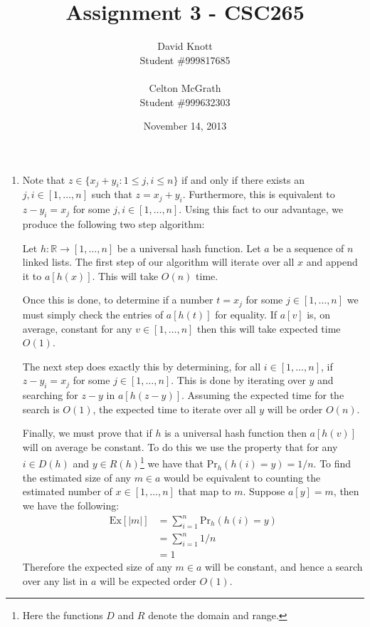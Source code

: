 \documentclass[letterpaper,10pt]{article}
\begin{document}
\title{Assignment 3 - CSC265}
\author{David Knott \\ Student \#999817685 \\ \\  Celton McGrath \\ Student \#999632303}
\date{November 14, 2013}
\maketitle
\begin{enumerate}
  \item Note that $z \in \{x_j + y_i : 1 \leq j, i \leq n \}$ if and only if there exists an $j, i \in [1,\dots, n] $ such that $z = x_j + y_i$. Furthermore, this is equivalent to $z - y_i = x_j$ for some $j, i \in [1,\dots, n] $. Using this fact to our advantage, we produce the following two step algorithm:

  Let $h : \mathbb{R} \to [1,\dots, n] $ be a universal hash function. Let $a$ be a sequence of $n$ linked lists. The first step of our algorithm will iterate over all $x$ and append it to $a[h(x)]$. This will take $O(n)$ time.

  Once this is done, to determine if a number $t = x_j$ for some $j \in [1,\dots,n]$ we must simply check the entries of $a[h(t)]$ for equality. If $a[v]$ is, on average, constant for any $v \in [1,\dots,n]$ then this will take expected time $O(1)$.

  The next step does exactly this by determining, for all $i \in [1,\dots,n]$, if $z - y_i = x_j$ for some $j \in [1,\dots,n]$. This is done by iterating over $y$ and searching for $z - y$ in $a[h(z-y)]$. Assuming the expected time for the search is $O(1)$, the expected time to iterate over all $y$ will be order $O(n)$.

  Finally, we must prove that if $h$ is a universal hash function then $a[h(v)]$ will on average be constant. To do this we use the property that for any $i \in D(h)$ and $y \in R(h)$\footnote{Here the functions $D$ and $R$ denote the domain and range.} we have that $\mathrm{Pr}_h(h(i) = y) = 1/n $. To find the estimated size of any $m \in a$ would be equivalent to counting the estimated number of $x \in [1,\dots,n]$ that map to $m$. Suppose $a[y] = m$, then we have the following:
  \begin{align*}
    \mathrm{Ex} [|m|] & = \sum_{i=1}^n \mathrm{Pr}_h(h(i) = y) \\
    & = \sum_{i=1}^n 1/n \\
    & = 1
  \end{align*}
  Therefore the expected size of any $m \in a$ will be constant, and hence a search over any list in $a$ will be expected order $O(1)$. 


\end{enumerate}
\end{document}
